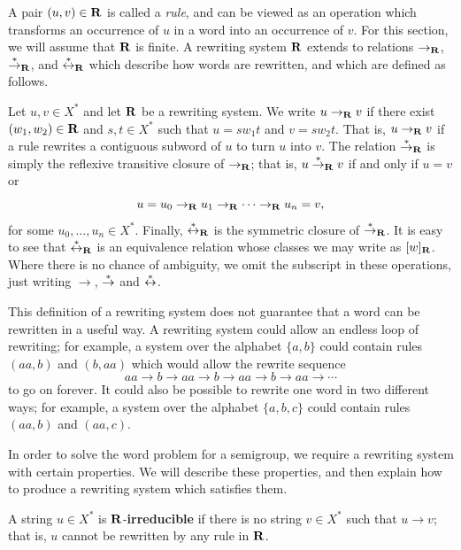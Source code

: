 A pair $(u,v) \in \mathbf{R}$ is called a \textit{rule}, and can be viewed as
an operation which transforms an occurrence of $u$ in a word into an occurrence
of $v$.
For this section, we will assume that $\mathbf{R}$ is finite.
A rewriting system $\mathbf{R}$ extends to relations
$\to_{\mathbf{R}}$, $\stackrel{*}{\to}_{\mathbf{R}}$, and $\stackrel{*}{\leftrightarrow}_{\mathbf{R}}$
which describe how words are rewritten, and which are defined as follows.

Let $u, v \in X^*$ and let $\mathbf{R}$ be a rewriting system.
We write $u \to_{\mathbf{R}} v$ if there exist $(w_1, w_2) \in \mathbf{R}$ and
$s, t \in X^*$ such that $u=sw_1t$ and $v=sw_2t$.
That is, $u \to_{\mathbf{R}} v$ if a rule rewrites a contiguous subword of $u$ to turn
$u$ into $v$.  The relation $\stackrel{*}{\to}_{\mathbf{R}}$ is simply the reflexive transitive
closure of $\to_{\mathbf{R}}$; that is, $u \stackrel{*}{\to}_{\mathbf{R}} v$ if and only if $u = v$ or
$$u = u_0 \to_{\mathbf{R}} u_1 \to_{\mathbf{R}} \cdots \to_{\mathbf{R}} u_n = v,$$
for some $u_0, \ldots, u_n \in X^*$.
Finally, $\stackrel{*}{\leftrightarrow}_{\mathbf{R}}$ is the symmetric closure of
$\stackrel{*}{\to}_{\mathbf{R}}$.  It is easy to see that $\stackrel{*}{\leftrightarrow}_{\mathbf{R}}$ is an equivalence
relation whose classes we may write as $[w]_{\mathbf{R}}$.
Where there is no chance of ambiguity, we omit the subscript in these
operations, just writing $\to$, $\stackrel{*}{\to}$ and $\stackrel{*}{\leftrightarrow}$.

This definition of a rewriting system does not guarantee that a word can be
rewritten in a useful way.  A rewriting system could allow an endless loop of
rewriting; for example, a system over the alphabet $\{a,b\}$ could contain rules
$(aa,b)$ and $(b,aa)$ which would allow the rewrite sequence
$$aa \to b \to aa \to b \to aa \to b \to aa \to \cdots$$
to go on forever.  It could also be possible to rewrite one word in
two different ways; for example, a system over the alphabet $\{a,b,c\}$ could
contain rules $(aa,b)$ and $(aa,c)$.

In order to solve the word problem for a semigroup, we require a
rewriting system with certain properties.  We will describe these properties,
and then explain how to produce a rewriting system which satisfies them.

\begin{definition}
  \label{def:irreducible}
  A string $u \in X^*$ is $\mathbf{R}$-\textbf{irreducible} if there is no
  string $v \in X^*$ such that $u \to v$; that is, $u$ cannot be rewritten by
  any rule in $\mathbf{R}$.  \cite[Def~12.13]{cgt}
\end{definition}

